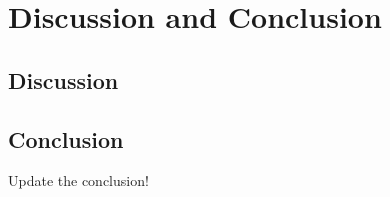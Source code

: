 \section{Discussion and Conclusion}
\subsection{Discussion}
\noindent


\subsection{Conclusion}
Update the conclusion!




